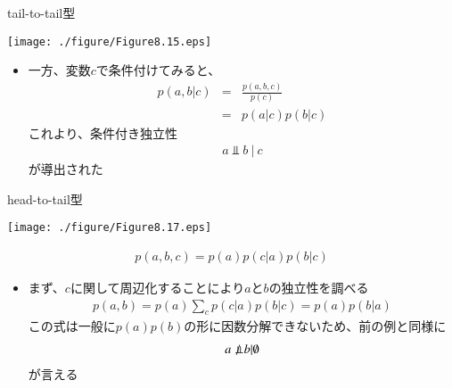 \begin{frame}{tail-to-tail型}
 \begin{center}
  \texttt{[image: ./figure/Figure8.15.eps]}
 \end{center}
 \begin{itemize}
  \item 一方、変数$c$で条件付けてみると、
        \begin{eqnarray*}
         p(a,b|c) &=& \frac{p(a,b,c)}{p(c)}\\
         &= & p(a|c)p(b|c)
        \end{eqnarray*}
        これより、条件付き独立性
        \begin{eqnarray*}
         a \Perp b \ | \ c
        \end{eqnarray*}
        が導出された
 \end{itemize}
\end{frame}

\begin{frame}{head-to-tail型}
 \begin{center}
  \texttt{[image: ./figure/Figure8.17.eps]}
 \end{center}
 \begin{eqnarray*}
  p(a,b,c) = p(a)p(c|a)p(b|c)
 \end{eqnarray*}
 \begin{itemize}
  \item まず、$c$に関して周辺化することにより$a$と$b$の独立性を調べる
        \begin{eqnarray*}
         p(a,b) = p(a)\sum_c p(c|a)p(b|c) = p(a)p(b|a)
        \end{eqnarray*}
        この式は一般に$p(a)p(b)$の形に因数分解できないため、前の例と同様に
        \begin{eqnarray*}
         a \nPerp \ b | \emptyset
        \end{eqnarray*}
        が言える
 \end{itemize}
\end{frame}

